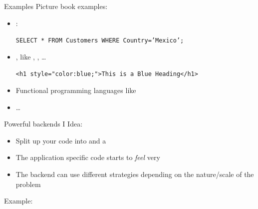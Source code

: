 \begin{frame}{Examples}
	Picture book examples:
	\begin{itemize}
		\item {} :
		\begin{center}
			\texttt{SELECT * FROM Customers WHERE Country='Mexico';}
		\end{center}
		\item {}, like ,  , \dots
		\begin{center}
			\texttt{<h1 style="color:blue;">This is a Blue Heading</h1>
			}
		\end{center}
		\item Functional programming languages like  
		\item \dots
\end{itemize}
\end{frame}
%
\begin{frame}{Powerful backends I}
	Idea:
	\begin{itemize}
		\item Split up your code into   and a  
		\item The application specific code starts to \emph{feel} very 
		\item The backend can use different strategies depending on the nature/scale of the problem
	\end{itemize}

	\medskip
	Example:
	\inputminted{python}{code/paradigms/dp/py_pandas.py}
\end{frame}
%
%

